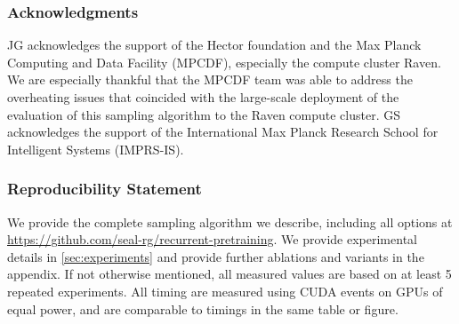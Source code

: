 \documentclass{article} %
\theoremstyle{definition}
\theoremstyle{plain}
\begin{document}




\subsubsection*{Acknowledgments}
JG acknowledges the support of the Hector foundation and the Max Planck Computing and Data Facility (MPCDF), especially the compute cluster Raven. We are especially thankful that the MPCDF team was able to address the overheating issues that coincided with the large-scale deployment of the evaluation of this sampling algorithm to the Raven compute cluster. GS acknowledges the support of the
International Max Planck Research School for Intelligent Systems (IMPRS-IS).




\subsubsection*{Reproducibility Statement}
We provide the complete sampling algorithm we describe, including all options at {\small \url{https://github.com/seal-rg/recurrent-pretraining}}. We provide experimental details in \cref{sec:experiments} and provide further ablations and variants in the appendix. If not otherwise mentioned, all measured values are based on at least 5 repeated experiments. All timing are measured using CUDA events on GPUs of equal power, and are comparable to timings in the same table or figure.  
{\small


}
\appendix
\end{document}
